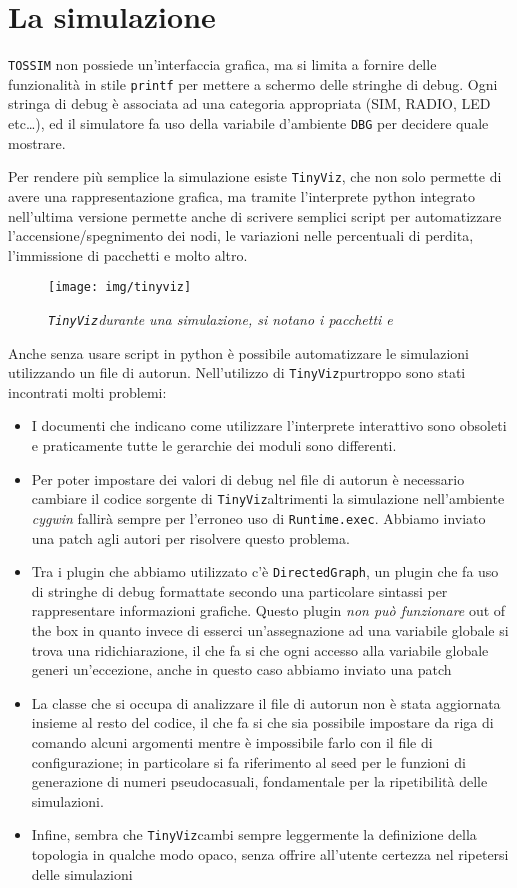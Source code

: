\documentclass[twoside,11pt,a4paper,italian,openany]{book}
\newcommand{\tv}{\texttt{TinyViz}}
\newcommand{\tos}{\texttt{TOSSIM} }
\begin{document}
\section{La simulazione}

\tos non possiede un'interfaccia grafica, ma si limita a fornire delle funzionalità in stile 
\texttt{printf} per mettere a schermo delle stringhe di debug. 
Ogni stringa di debug è associata ad una categoria appropriata (SIM, RADIO, LED etc\ldots), 
ed il simulatore fa uso della variabile d'ambiente \texttt{DBG} per decidere quale mostrare. 

Per rendere più semplice la simulazione esiste \tv, che non solo permette di avere una 
rappresentazione grafica, ma tramite l'interprete python integrato nell'ultima versione 
permette anche di scrivere semplici script per automatizzare l'accensione/spegnimento dei nodi,
le variazioni nelle percentuali di perdita, l'immissione di pacchetti e molto altro. 
\begin{figure}
\texttt{[image: img/tinyviz]}
\caption{\emph{\tv durante una simulazione, si notano i pacchetti \ack e \req}}
\end{figure}
Anche senza usare script in python è possibile automatizzare le simulazioni utilizzando un file 
di autorun.
Nell'utilizzo di \tv purtroppo sono stati incontrati molti problemi:
\begin{itemize}
\item{I documenti che indicano come utilizzare l'interprete interattivo sono obsoleti e 
praticamente tutte le gerarchie dei moduli sono differenti.}
\item{Per poter impostare dei valori di debug nel file di autorun è necessario  
cambiare il codice sorgente di \tv altrimenti la simulazione nell'ambiente \emph{cygwin} 
fallirà sempre per l'erroneo uso di \texttt{Runtime.exec}. Abbiamo inviato una patch 
agli autori per risolvere questo problema.}
\item{Tra i plugin  che abbiamo utilizzato c'è \texttt{DirectedGraph}, un plugin che fa uso 
di stringhe di debug formattate secondo una particolare sintassi per rappresentare informazioni 
grafiche. Questo plugin \emph{non può funzionare} out of the box in quanto invece di esserci 
un'assegnazione ad una variabile globale si trova una ridichiarazione, il che fa si che 
ogni accesso alla variabile globale generi un'eccezione, anche in questo caso abbiamo inviato una patch}
\item{La classe che si occupa di analizzare il file di autorun non è stata aggiornata insieme 
al resto del codice, il che fa si che sia possibile impostare da riga di comando alcuni 
argomenti mentre è impossibile farlo con il file di configurazione; 
in particolare si fa riferimento al seed per le funzioni di generazione di numeri pseudocasuali, 
fondamentale per la ripetibilità delle simulazioni.}
\item{Infine, sembra che \tv cambi sempre leggermente la definizione della topologia in qualche modo opaco, senza offrire all'utente certezza nel ripetersi delle simulazioni}
\end{itemize}
\end{document}
